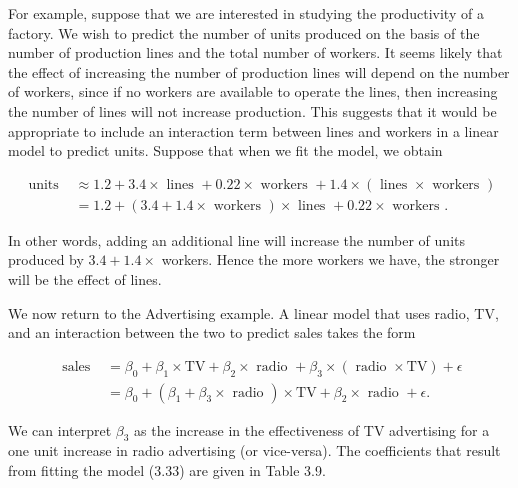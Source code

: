 \documentclass[10pt]{article}
\begin{document}
For example, suppose that we are interested in studying the productivity of a factory. We wish to predict the number of units produced on the basis of the number of production lines and the total number of workers. It seems likely that the effect of increasing the number of production lines will depend on the number of workers, since if no workers are available to operate the lines, then increasing the number of lines will not increase production. This suggests that it would be appropriate to include an interaction term between lines and workers in a linear model to predict units. Suppose that when we fit the model, we obtain

$$
\begin{aligned}
\text { units } & \approx 1.2+3.4 \times \text { lines }+0.22 \times \text { workers }+1.4 \times(\text { lines } \times \text { workers }) \\
& =1.2+(3.4+1.4 \times \text { workers }) \times \text { lines }+0.22 \times \text { workers } .
\end{aligned}
$$

In other words, adding an additional line will increase the number of units produced by $3.4+1.4 \times$ workers. Hence the more workers we have, the stronger will be the effect of lines.

We now return to the Advertising example. A linear model that uses radio, TV, and an interaction between the two to predict sales takes the form


\begin{align*}
\text { sales } & =\beta_{0}+\beta_{1} \times \mathrm{TV}+\beta_{2} \times \text { radio }+\beta_{3} \times(\text { radio } \times \mathrm{TV})+\epsilon \\
& =\beta_{0}+\left(\beta_{1}+\beta_{3} \times \text { radio }\right) \times \mathrm{TV}+\beta_{2} \times \text { radio }+\epsilon . \tag{3.33}
\end{align*}


We can interpret $\beta_{3}$ as the increase in the effectiveness of TV advertising for a one unit increase in radio advertising (or vice-versa). The coefficients that result from fitting the model (3.33) are given in Table 3.9.
\end{document}
